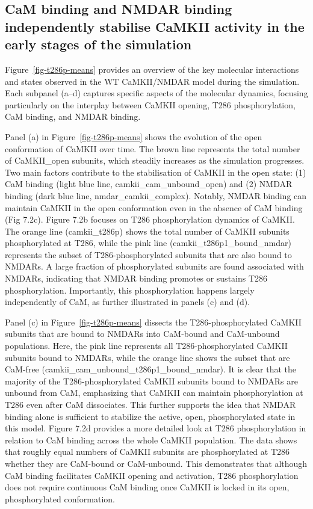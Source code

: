 \documentclass[
  11pt,
  letterpaper,
]{scrreprt}
\begin{document}
\subsection{CaM binding and NMDAR binding independently stabilise CaMKII
activity in the early stages of the
simulation}\label{cam-binding-and-nmdar-binding-independently-stabilise-camkii-activity-in-the-early-stages-of-the-simulation}

Figure~\ref{fig-t286p-means} provides an overview of the key molecular
interactions and states observed in the WT CaMKII/NMDAR model during the
simulation. Each subpanel (a--d) captures specific aspects of the
molecular dynamics, focusing particularly on the interplay between
CaMKII opening, T286 phosphorylation, CaM binding, and NMDAR binding.

Panel (a) in Figure~\ref{fig-t286p-means} shows the evolution of the
open conformation of CaMKII over time. The brown line represents the
total number of CaMKII\_open subunits, which steadily increases as the
simulation progresses. Two main factors contribute to the stabilisation
of CaMKII in the open state: (1) CaM binding (light blue line,
camkii\_cam\_unbound\_open) and (2) NMDAR binding (dark blue line,
nmdar\_camkii\_complex). Notably, NMDAR binding can maintain CaMKII in
the open conformation even in the absence of CaM binding (Fig 7.2c).
Figure 7.2b focuses on T286 phosphorylation dynamics of CaMKII. The
orange line (camkii\_t286p) shows the total number of CaMKII subunits
phosphorylated at T286, while the pink line
(camkii\_t286p1\_bound\_nmdar) represents the subset of
T286-phosphorylated subunits that are also bound to NMDARs. A large
fraction of phosphorylated subunits are found associated with NMDARs,
indicating that NMDAR binding promotes or sustains T286 phosphorylation.
Importantly, this phosphorylation happens largely independently of CaM,
as further illustrated in panels (c) and (d).

Panel (c) in Figure~\ref{fig-t286p-means} dissects the
T286-phosphorylated CaMKII subunits that are bound to NMDARs into
CaM-bound and CaM-unbound populations. Here, the pink line represents
all T286-phosphorylated CaMKII subunits bound to NMDARs, while the
orange line shows the subset that are CaM-free
(camkii\_cam\_unbound\_t286p1\_bound\_nmdar). It is clear that the
majority of the T286-phosphorylated CaMKII subunits bound to NMDARs are
unbound from CaM, emphasizing that CaMKII can maintain phosphorylation
at T286 even after CaM dissociates. This further supports the idea that
NMDAR binding alone is sufficient to stabilize the active, open,
phosphorylated state in this model. Figure 7.2d provides a more detailed
look at T286 phosphorylation in relation to CaM binding across the whole
CaMKII population. The data shows that roughly equal numbers of CaMKII
subunits are phosphorylated at T286 whether they are CaM-bound or
CaM-unbound. This demonstrates that although CaM binding facilitates
CaMKII opening and activation, T286 phosphorylation does not require
continuous CaM binding once CaMKII is locked in its open, phosphorylated
conformation.
\end{document}
